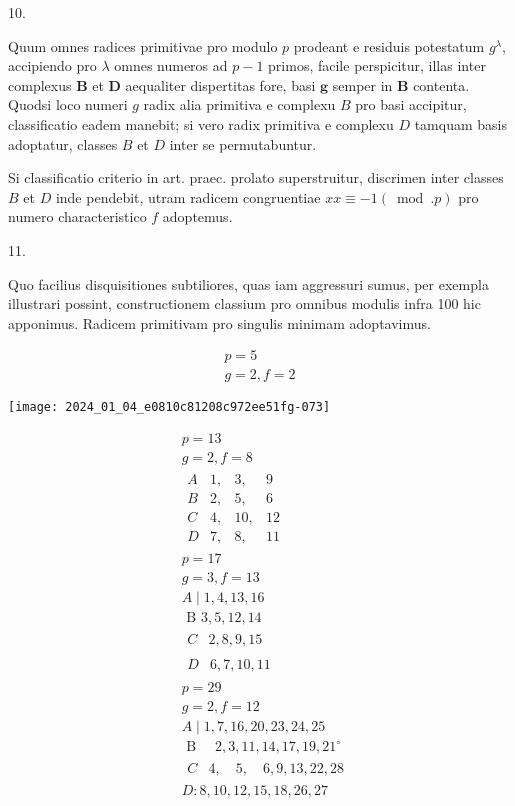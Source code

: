\documentclass[10pt]{article}
\begin{document}
10.

Quum omnes radices primitivae pro modulo \(p\) prodeant e residuis potestatum \(g^{\lambda}\), accipiendo pro \(\lambda\) omnes numeros ad \(p-1\) primos, facile perspicitur, illas inter complexus \(\boldsymbol{B}\) et \(\boldsymbol{D}\) aequaliter dispertitas fore, basi \(\boldsymbol{g}\) semper in \(\boldsymbol{B}\) contenta. Quodsi loco numeri \(g\) radix alia primitiva e complexu \(B\) pro basi accipitur, classificatio eadem manebit; si vero radix primitiva e complexu \(D\) tamquam basis adoptatur, classes \(B\) et \(D\) inter se permutabuntur.

Si classificatio criterio in art. praec. prolato superstruitur, discrimen inter classes \(B\) et \(D\) inde pendebit, utram radicem congruentiae \(x x \equiv-1(\bmod . p)\) pro numero characteristico \(f\) adoptemus.

11.

Quo facilius disquisitiones subtiliores, quas iam aggressuri sumus, per exempla illustrari possint, constructionem classium pro omnibus modulis infra 100 hic apponimus. Radicem primitivam pro singulis minimam adoptavimus.

\[
\begin{gathered}
p=5 \\
g=2, f=2
\end{gathered}
\]

\begin{center}
\texttt{[image: 2024\_01\_04\_e0810c81208c972ee51fg-073]}
\end{center}

\[
\begin{aligned}
& p=13 \\
& g=2, f=8 \\
& \begin{array}{r|rrr}
A & 1, & 3, & 9 \\
B & 2, & 5, & 6 \\
C & 4, & 10, & 12 \\
D & 7, & 8, & 11
\end{array} \\
& p=17 \\
& g=3, f=13 \\
& A \mid 1,4,13,16 \\
& \text { B } 3,5,12,14 \\
& \begin{array}{l|l}
C & 2,8,9,15
\end{array} \\
& \begin{array}{l|l}
D & 6,7,10,11
\end{array} \\
& p=29 \\
& g=2, f=12 \\
& A \mid 1,7,16,20,23,24,25 \\
& \text { B } \quad 2,3,11,14,17,19,21^{\circ} \\
& \begin{array}{l|lll}
C & 4, \quad 5, \quad 6,9,13,22,28
\end{array} \\
& D: 8,10,12,15,18,26,27
\end{aligned}
\]
\end{document}

